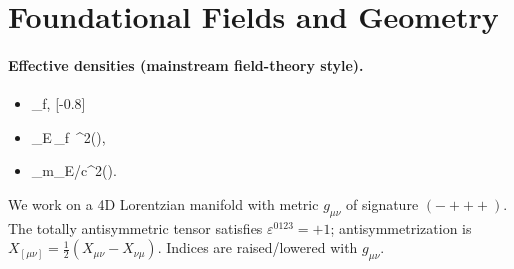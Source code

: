 \documentclass[11pt, preprint,titlepage]{revtex4-2}
\newcommand{\rhoF}{\rho_{\!f}}      %
\newcommand{\rhoE}{\rho_{\!E}}      %
\newcommand{\rhoM}{\rho_{\!m}}      %
\newcommand{\vnorm}{\lVert \mathbf{v} \rVert} %
\begin{document}
	\section{Foundational Fields and Geometry}
	\paragraph{Effective densities (mainstream field-theory style).}
	\begin{itemize}
		\item \rhoF \equiv {}, [-0.8]
		\item \rhoE \equiv {}\,\rhoF\,\vnorm^{2}\quad(),
		\item \rhoM \equiv \rhoE/c^{2}\quad().
	\end{itemize}


	We work on a 4D Lorentzian manifold with metric \(g_{\mu\nu}\) of signature \((-+++)\). The totally antisymmetric tensor satisfies \(\varepsilon^{0123}=+1\); antisymmetrization is \(X_{[\mu\nu]}=\tfrac12(X_{\mu\nu}-X_{\nu\mu})\). Indices are raised/lowered with \(g_{\mu\nu}\).
\end{document}
